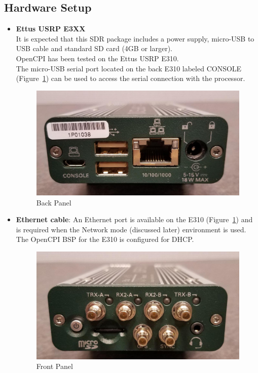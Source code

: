 \begin{flushleft}
\subsection{Hardware Setup}
\begin{itemize}
\item \textbf{Ettus USRP E3XX}\\ \medskip
It is expected that this SDR package includes a power supply, micro-USB to USB cable and standard SD card (4GB or larger). \\ \medskip
OpenCPI has been tested on the Ettus USRP E310. \\ \medskip
The micro-USB serial port located on the back E310 labeled CONSOLE (Figure~\ref{fig:back}) can be used to access the serial connection with the processor.\medskip
\begin{figure}[H]
 \centering
 \includegraphics[scale=0.5]{img/back_panel.jpg}
 \caption{Back Panel}
 \label{fig:back}
\end{figure}

\item \textbf{Ethernet cable}:
An Ethernet port is available on the E310 (Figure~\ref{fig:back}) and is required when the Network mode (discussed later) environment is used. The OpenCPI BSP for the E310 is configured for DHCP.\medskip

\begin{figure}[H]
 \centering
 \includegraphics[scale=0.5]{img/front_panel.jpg}
 \caption{Front Panel}
 \label{fig:front}
\end{figure}


\end{itemize}
\end{flushleft}
